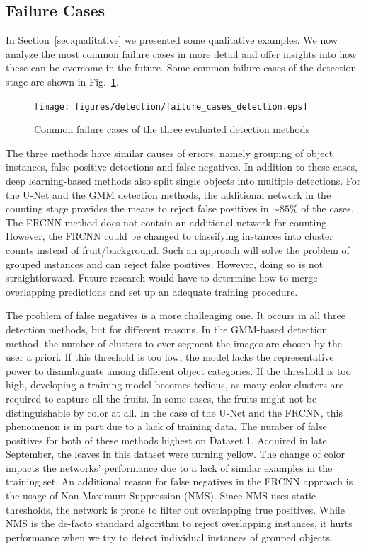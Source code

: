 \subsection{Failure Cases}
In Section~\ref{sec:qualitative} we presented some qualitative examples. We now analyze the most common failure cases in more detail and offer insights into how these can be overcome in the future. Some common failure cases of the detection stage are shown in Fig.~{\ref{fig:failuregmm-unet}}.

\begin{figure}[htb]
    \centering
    \texttt{[image: figures/detection/failure\_cases\_detection.eps]}
    \caption[Common failure cases of the detection methods.]{Common failure cases of the three evaluated detection methods}
    \label{fig:failuregmm-unet}
\end{figure}

The three methods have similar causes of errors, namely grouping of object instances, false-positive detections and false negatives. In addition to these cases, deep learning-based methods also split single objects into multiple detections. For the U-Net and the GMM detection methods, the additional network in the counting stage provides the means to reject false positives in $\sim 85\%$ of the cases. The FRCNN method does not contain an additional network for counting. However, the FRCNN could be changed to classifying instances into cluster counts instead of fruit/background. Such an approach will solve the problem of grouped instances and can reject false positives. However, doing so is not straightforward. Future research would have to determine how to merge overlapping predictions and set up an adequate training procedure.

The problem of false negatives is a more challenging one. It occurs in all three detection methods, but for different reasons. In the GMM-based detection method, the number of clusters to over-segment the images are chosen by the user a priori. If this threshold is too low, the model lacks the representative power to disambiguate among different object categories. If the threshold is too high, developing a training model becomes tedious, as many color clusters are required to capture all the fruits. In some cases, the fruits might not be distinguishable by color at all.
In the case of the U-Net and the FRCNN, this phenomenon is in part due to a lack of training data. The number of false positives for both of these methods highest on Dataset 1. Acquired in late September, the leaves in this dataset were turning yellow. The change of color impacts the networks' performance due to a lack of similar examples in the training set. An additional reason for false negatives in the FRCNN approach is the usage of Non-Maximum Suppression (NMS). Since NMS uses static thresholds, the network is prone to filter out overlapping true positives. While NMS is the de-facto standard algorithm to reject overlapping instances, it hurts performance when we try to detect individual instances of grouped objects.

